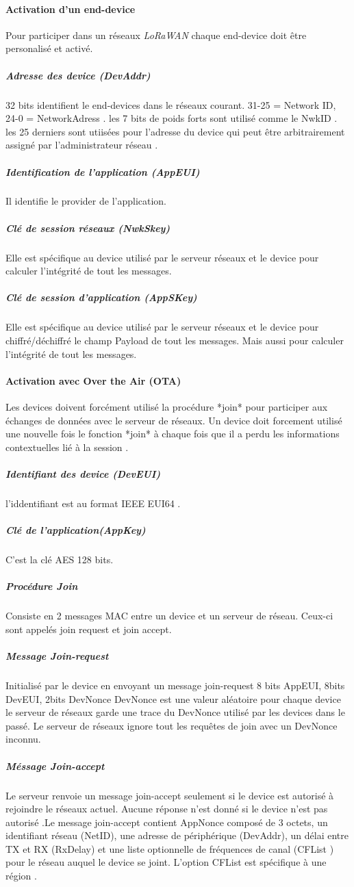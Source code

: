 \documentclass[11pt]{article}
\begin{document}
\paragraph{Activation d'un end-device}
Pour participer dans un réseaux  \textit{LoRaWAN} chaque end-device doit être personalisé et activé.

\subparagraph{Adresse des device (DevAddr)}
32 bits identifient le end-devices dans le réseaux courant.
31-25 = Network ID, 24-0 = NetworkAdress .
les 7 bits de poids forts sont utilisé comme le NwkID .
les 25 derniers sont utiisées pour l'adresse du device qui peut être arbitrairement assigné par l'administrateur réseau .
\subparagraph{Identification de l'application (AppEUI)}
Il identifie le provider de l'application.
\subparagraph{Clé de session réseaux (NwkSkey)}
Elle est spécifique au device utilisé par le serveur réseaux et le device pour calculer l'intégrité de tout les messages.
\subparagraph{Clé de session d'application (AppSKey)}
Elle est spécifique au device utilisé par le serveur réseaux et le device pour chiffré/déchiffré le champ Payload de tout les messages. Mais aussi pour calculer l'intégrité de tout les messages.

\paragraph{Activation avec Over the Air (OTA)}
Les devices doivent forcément utilisé la procédure *join* pour participer aux échanges de données avec le serveur de réseaux. Un device doit forcement utilisé une nouvelle fois le fonction *join* à chaque fois que il a perdu les informations contextuelles lié à la session .
\subparagraph{Identifiant des device (DevEUI)}
l'iddentifiant est au format IEEE EUI64 .
\subparagraph{Clé de l'application(AppKey)}
C'est la clé AES 128 bits.
\subparagraph{Procédure Join}
Consiste en 2 messages MAC entre un device et un serveur de réseau. Ceux-ci sont appelés join request et join accept.
\subparagraph{Message Join-request}
Initialisé par le device en envoyant un message join-request
8 bits AppEUI, 8bits DevEUI, 2bits DevNonce
DevNonce est une valeur aléatoire pour chaque device le serveur de réseaux garde une trace du DevNonce utilisé par les devices dans le passé.  Le serveur de réseaux ignore tout les requêtes de join avec un DevNonce inconnu.
\subparagraph{Méssage Join-accept }
Le serveur renvoie un message join-accept seulement si le device est autorisé à rejoindre le réseaux actuel.
Aucune réponse n'est donné si le device n'est pas autorisé .Le message join-accept contient AppNonce composé  de 3 octets, un identifiant réseau (NetID), une adresse de périphérique (DevAddr), un délai entre TX et RX (RxDelay) et une liste optionnelle de fréquences de canal (CFList ) pour le réseau auquel le device se joint. L'option CFList est spécifique à une région .
\end{document}
